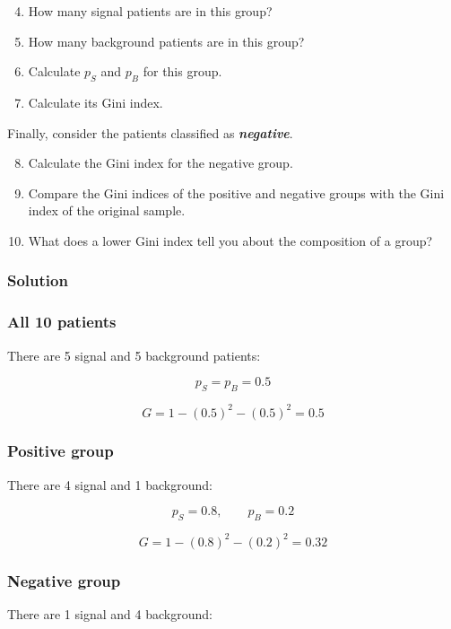 \documentclass[10pt]{article}
\begin{document}
\begin{enumerate}
\setcounter{enumi}{3}
\item
How many signal patients are in this group?

\item
How many background patients are in this group?

\item
Calculate $p_S$ and $p_B$ for this group.

\item
Calculate its Gini index.

\end{enumerate}
Finally, consider the patients classified as \textbf{\textit{negative}}.

\begin{enumerate}
\setcounter{enumi}{7}
\item
Calculate the Gini index for the negative group.

\item
Compare the Gini indices of the positive and negative groups with the Gini index of the original sample.

\item
What does a lower Gini index tell you about the composition of a group?

\end{enumerate}
\begingroup\color{red}

\subsubsection*{Solution}
\subsubsection*{All 10 patients}
There are 5 signal and 5 background patients:

\[
p_S=p_B=0.5
\]

\[
G=1-(0.5)^2-(0.5)^2
={0.5}
\]

\subsubsection*{Positive group}
There are 4 signal and 1 background:

\[
p_S=0.8,\qquad p_B=0.2
\]

\[
G=1-(0.8)^2-(0.2)^2
={0.32}
\]

\subsubsection*{Negative group}
There are 1 signal and 4 background:
\end{document}
